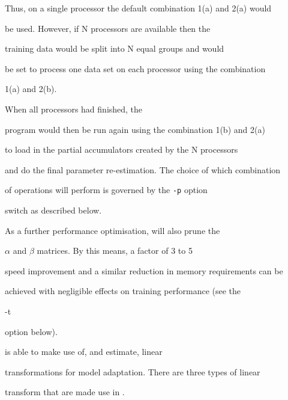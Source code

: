 Thus, on a single processor the default combination 1(a) and 2(a) would


be used.  However, if N processors are available then the 


training data would be split into N equal groups and  would


be set to process one data set on each processor using the combination


1(a) and 2(b). 


When all processors had finished, the 


program would then be run again using the combination 1(b) and 2(a)


to load in the partial accumulators created by the N processors


and do the final parameter re-estimation.  The choice of which combination


of operations  will perform is governed by the {\tt -p} option


switch as described below.





As a further performance optimisation,  will also prune the


$\alpha$ and $\beta$ matrices.  By this means, a factor of 3 to 5


speed improvement and a similar reduction in memory requirements can be


achieved with negligible effects on training performance (see the {\tt


-t} option below).  





 is able to make use of, and estimate, linear


transformations for model adaptation. There are three types of linear


transform that are made use in .


